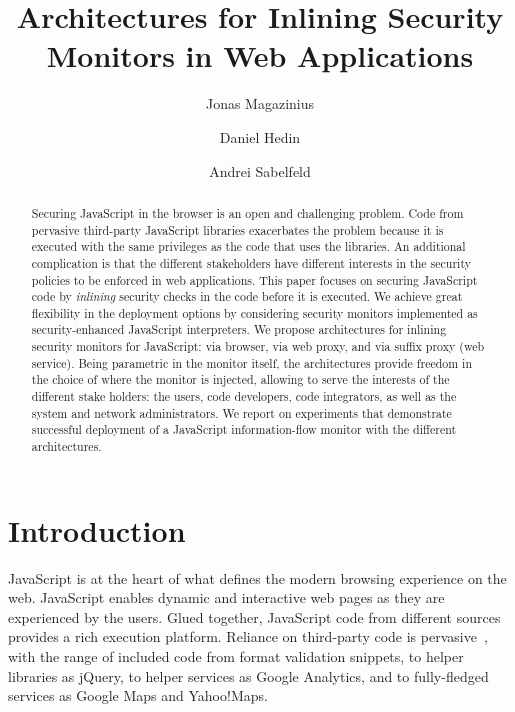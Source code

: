 \documentclass{llncs}
\title{Architectures for Inlining Security Monitors in Web Applications}
\author{Jonas Magazinius \and Daniel Hedin \and Andrei Sabelfeld}
\institute{Chalmers University of Technology, Gothenburg, Sweden}
\begin{document}
\maketitle

\thispagestyle{plain}

\begin{abstract}
Securing JavaScript in the browser is an open and challenging
problem. Code from pervasive third-party JavaScript libraries exacerbates the
problem because it is executed with the same privileges as the code
that uses the libraries.
%
An additional complication is that the different stakeholders have
different interests in the security policies to be enforced
in web applications.
%
This paper focuses on securing JavaScript code by \emph{inlining}
security checks in the code before it is executed.
%
We achieve great flexibility in the deployment options by considering
security monitors implemented as security-enhanced JavaScript interpreters.
%
We propose architectures for inlining security monitors for JavaScript: via
browser, via web proxy, and via suffix proxy (web service). 
%
Being parametric in the monitor itself,
the architectures provide freedom in the choice of where the monitor is
injected, allowing to serve the interests of the different stake
holders: the users, code developers, code
integrators, as well as the system and network administrators.
%
We report on experiments that demonstrate successful deployment of a JavaScript
information-flow monitor with the different architectures.
\end{abstract}










\section{Introduction}
\label{sec:intro}
JavaScript is at the heart of what defines the modern
browsing experience on the web. JavaScript enables dynamic and interactive
web pages as they are experienced by the users. Glued together,
JavaScript code from different sources provides
a rich execution platform. Reliance on third-party code is
pervasive~\cite{Nikiforakis+:CCS12}, with the range of included code from
format validation snippets, to helper
libraries as jQuery, to helper services as Google Analytics, and to fully-fledged services as
Google Maps and Yahoo!\@ Maps.
\end{document}
